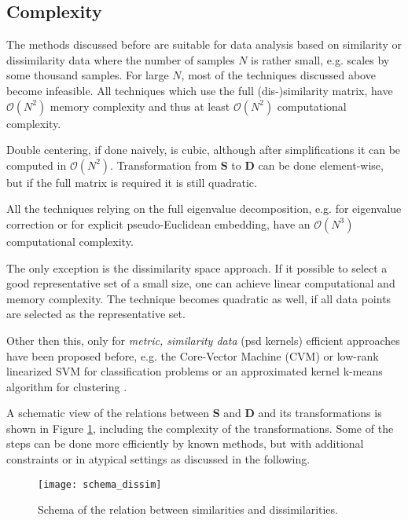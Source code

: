 \documentclass[twoside,11pt]{article}
\begin{document}
\subsection{Complexity}
The methods discussed before are suitable for data analysis based on similarity or dissimilarity data
where the number of samples $N$ is rather small, e.g. scales by some thousand samples. 
For large $N$, most of the techniques discussed above become infeasible.
All techniques which use the full (dis-)similarity matrix,
have $\mathcal{O}(N^2)$ memory complexity
and thus at least $\mathcal{O}(N^2)$ computational complexity.

Double centering, if done naively, is cubic,
although after simplifications it can be computed in $\mathcal{O}(N^2)$.
Transformation from $\mathbf{S}$ to $\mathbf{D}$ can be done element-wise,
but if the full matrix is required it is still quadratic.

All the techniques relying on the full eigenvalue decomposition,
e.g. for eigenvalue correction or for explicit pseudo-Euclidean embedding,
have an $\mathcal{O}(N^3)$ computational complexity.

The only exception is the dissimilarity space approach.
If it possible to select a good representative set of a small size,
one can achieve linear computational and memory complexity.
The technique becomes quadratic as well,
if all data points are selected as the representative set.

Other then this,
only for \emph{metric, similarity data} (psd kernels) efficient approaches have been proposed before, e.g. 
the Core-Vector Machine (CVM) \cite{DBLP:conf/icml/TsangKK07} or low-rank linearized SVM \cite{DBLP:journals/jmlr/ZhangLWM12}
for classification problems or an approximated kernel k-means algorithm for clustering \cite{DBLP:conf/kdd/ChittaJHJ11}.


A schematic view of the relations between $\mathbf{S}$ and $\mathbf{D}$ and its transformations
is shown in Figure \ref{fig:simdis_schema}, including the complexity of the transformations.
Some of the steps can be done more efficiently by known methods,
but with additional constraints or in atypical settings as discussed in the following.

\begin{figure}
	\centering
	\texttt{[image: schema\_dissim]}
	\caption{Schema of the relation between similarities and dissimilarities.}
	\label{fig:simdis_schema}
\end{figure}
\end{document}
